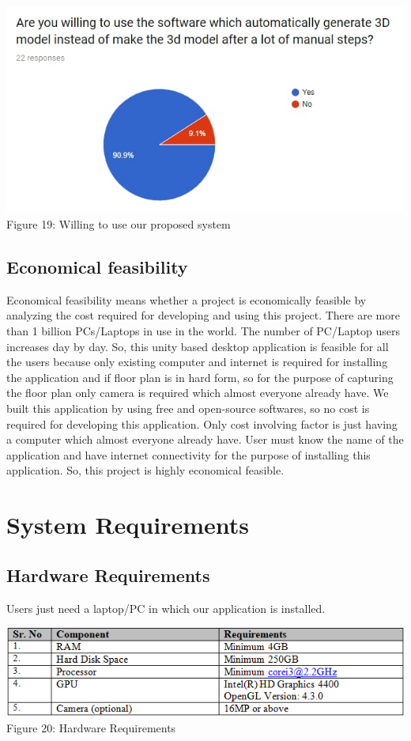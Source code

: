 \documentclass{article}
\begin{document}
\begin{center}
\includegraphics[scale=0.7]{lastgraph}
\\Figure 19: Willing to use our proposed system
\end{center}
 

\subsection{Economical feasibility}

Economical feasibility means whether a project is economically feasible by analyzing the cost required for developing and using this project. There are more than 1 billion PCs/Laptops in use in the world. The number of PC/Laptop users increases day by day. So, this unity based desktop application is feasible for all the users because only existing computer and internet is required for installing the application and if floor plan is in hard form, so for the purpose of capturing  the floor plan only camera is required which almost everyone already have. We built this application by using free and open-source softwares, so no cost is required for developing this application. Only cost involving factor is just having a computer which almost everyone already have. User must know the name of the application and have internet connectivity for the purpose of installing this application. So, this project is highly economical feasible.\cite{econFeas}\\

\section{System Requirements}
\subsection{Hardware Requirements}
Users just need a laptop/PC in which our application is installed.
\begin{center}
\includegraphics[scale=0.8]{table2}
\\Figure 20: Hardware Requirements
\end{center}
\end{document}
